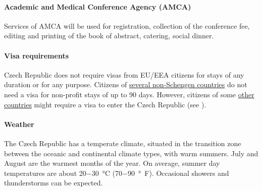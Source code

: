\documentclass[12pt]{extarticle}
\begin{document}
\paragraph{Academic and Medical Conference Agency (AMCA)}
Services of AMCA will be used for registration, collection of the
conference fee, editing and printing of the book of abstract,
catering, social dinner.

\paragraph{Visa requirements}
Czech Republic does not require visas from EU/EEA citizens for stays
of any duration or for any purpose. Citizens of
\href{https://www.mzv.cz/jnp/en/information_for_aliens/short_stay_visa/list_of_states_whose_citizens_are_exempt/index.html}{several
  non-Schengen countries} do not need a visa for non-profit stays of
up to 90 days. However, citizens of some
\href{https://www.mzv.cz/jnp/en/information_for_aliens/short_stay_visa/list_of_states_whose_citizens_are/index.html}{other
  countries} might require a visa to enter the Czech Republic (see ).


\paragraph{Weather}
The Czech Republic has a temperate climate, situated in the transition
zone between the oceanic and continental climate types, with warm
summers. July and August are the warmest months of the year. On
average, summer day temperatures are about
\qty[parse-numbers=false]{20-30}{\celsius}
(\qty[parse-numbers=false]{70-90}{\degree F}). Occasional showers and
thunderstorms can be expected.
\end{document}
